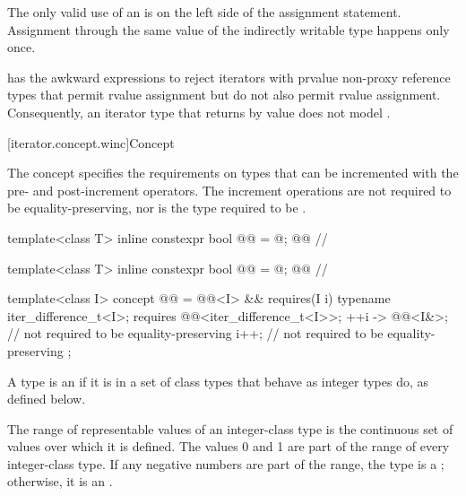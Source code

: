 \pnum
\begin{note}
The only valid use of an  is on the left side of the assignment statement.
Assignment through the same value of the indirectly writable type happens only once.
\end{note}

\pnum
\begin{note}
 has the awkward  expressions to reject
iterators with prvalue non-proxy reference types that permit rvalue
assignment but do not also permit  rvalue assignment.
Consequently, an iterator type  that returns 
by value does not model .
\end{note}

[iterator.concept.winc]{Concept }

\pnum
The  concept specifies the requirements on
types that can be incremented with the pre- and post-increment operators.
The increment operations are not required to be equality-preserving,
nor is the type required to be .

\begin{codeblock}
template<class T>
  inline constexpr bool @@ = @\seebelow@; @\itcorr[-2]@           // \expos

template<class T>
  inline constexpr bool @@ = @\seebelow@; @\itcorr[-2]@    // \expos

template<class I>
  concept @@ =
    @@<I> &&
    requires(I i) {
      typename iter_difference_t<I>;
      requires @@<iter_difference_t<I>>;
      { ++i } -> @@<I&>;   // not required to be equality-preserving
      i++;                      // not required to be equality-preserving
    };
\end{codeblock}

\pnum
A type  is an 
if it is in a set of  class types
that behave as integer types do, as defined below.

\pnum
The range of representable values of an integer-class type
is the continuous set of values over which it is defined.
The values 0 and 1 are part of the range of every integer-class type.
If any negative numbers are part of the range,
the type is a ;
otherwise, it is an .

